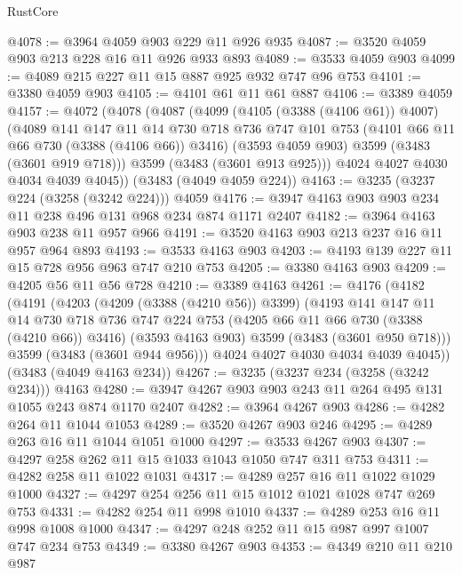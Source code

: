 \begin{lexlean}{RustCore}
\begin{coremodule}
@4078 := @3964 @4059 @903 @229 @11 @926 @935
@4087 := @3520 @4059 @903 @213 @228 @16 @11 @926 @933 @893
@4089 := @3533 @4059 @903
@4099 := @4089 @215 @227 @11 @15 @887 @925 @932 @747 @96 @753
@4101 := @3380 @4059 @903
@4105 := @4101 @61 @11 @61 @887
@4106 := @3389 @4059
@4157 := @4072
    (@4078
      (@4087
        (@4099
          (@4105 (@3388 (@4106 @61)) @4007)
          (@4089
            @141
            @147
            @11
            @14
            @730
            @718
            @736
            @747
            @101
            @753
            (@4101 @66 @11 @66 @730 (@3388 (@4106 @66)) @3416)
            (@3593 @4059 @903)
            @3599
            (@3483 (@3601 @919 @718)))
          @3599
          (@3483 (@3601 @913 @925)))
        @4024
        @4027
        @4030
        @4034
        @4039
        @4045))
    (@3483 (@4049 @4059 @224))
@4163 := @3235 (@3237 @224 (@3258 (@3242 @224))) @4059
@4176 := @3947 @4163 @903 @903 @234 @11 @238 @496 @131 @968 @234 @874 @1171 @2407
@4182 := @3964 @4163 @903 @238 @11 @957 @966
@4191 := @3520 @4163 @903 @213 @237 @16 @11 @957 @964 @893
@4193 := @3533 @4163 @903
@4203 := @4193 @139 @227 @11 @15 @728 @956 @963 @747 @210 @753
@4205 := @3380 @4163 @903
@4209 := @4205 @56 @11 @56 @728
@4210 := @3389 @4163
@4261 := @4176
    (@4182
      (@4191
        (@4203
          (@4209 (@3388 (@4210 @56)) @3399)
          (@4193
            @141
            @147
            @11
            @14
            @730
            @718
            @736
            @747
            @224
            @753
            (@4205 @66 @11 @66 @730 (@3388 (@4210 @66)) @3416)
            (@3593 @4163 @903)
            @3599
            (@3483 (@3601 @950 @718)))
          @3599
          (@3483 (@3601 @944 @956)))
        @4024
        @4027
        @4030
        @4034
        @4039
        @4045))
    (@3483 (@4049 @4163 @234))
@4267 := @3235 (@3237 @234 (@3258 (@3242 @234))) @4163
@4280 := @3947 @4267 @903 @903 @243 @11 @264 @495 @131 @1055 @243 @874 @1170 @2407
@4282 := @3964 @4267 @903
@4286 := @4282 @264 @11 @1044 @1053
@4289 := @3520 @4267 @903 @246
@4295 := @4289 @263 @16 @11 @1044 @1051 @1000
@4297 := @3533 @4267 @903
@4307 := @4297 @258 @262 @11 @15 @1033 @1043 @1050 @747 @311 @753
@4311 := @4282 @258 @11 @1022 @1031
@4317 := @4289 @257 @16 @11 @1022 @1029 @1000
@4327 := @4297 @254 @256 @11 @15 @1012 @1021 @1028 @747 @269 @753
@4331 := @4282 @254 @11 @998 @1010
@4337 := @4289 @253 @16 @11 @998 @1008 @1000
@4347 := @4297 @248 @252 @11 @15 @987 @997 @1007 @747 @234 @753
@4349 := @3380 @4267 @903
@4353 := @4349 @210 @11 @210 @987

\end{coremodule}
\end{lexlean}
